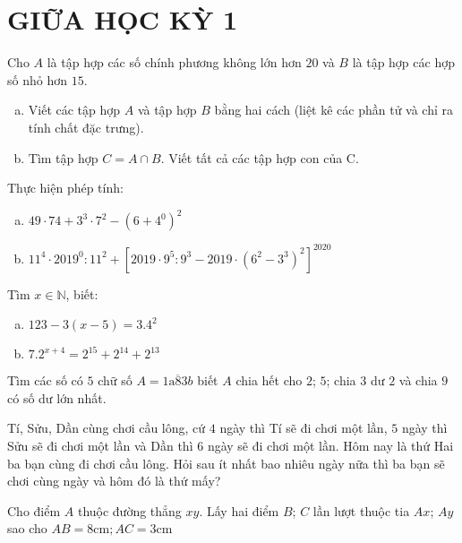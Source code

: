 \section{GIỮA HỌC KỲ 1}
\setcounter{ex}{0}
\begin{ex} Cho $A$ là tập hợp các số chính phương không lớn hơn $20$ và $B$ là tập hợp các hợp số nhỏ hơn $15$.
	\begin{enumerate}[a)]
	\item Viết các tập hợp $A$ và tập hợp $B$ bằng hai cách (liệt kê các phần tử và chỉ ra tính chất đặc trưng).
	\item Tìm tập hợp $C=A \cap B$. Viết tất cả các tập hợp con của C.
	\end{enumerate}
%
\end{ex}    \begin{ex} Thực hiện phép tính:
\begin{enumerate}[a)]
	\item $49 \cdot 74+3^{3} \cdot 7^{2}-\left(6+4^{0}\right)^{2}$
	\item $11^{4} \cdot 2019^{0}: 11^{2}+\left[2019 \cdot 9^{5}: 9^{3}-2019 \cdot\left(6^{2}-3^{3}\right)^{2}\right]^{2020}$
	\end{enumerate} 
	\end{ex}    \begin{ex} Tìm $x \in \mathbb{N}$, biết:
	\begin{enumerate}[a)]
	\item $123-3(x-5)=3.4^{2}$
	\item $7.2^{x+4}=2^{15}+2^{14}+2^{13}$
	\end{enumerate}
\end{ex}    \begin{ex}  Tìm các số có $5$ chữ số $A=\overline{1 \mathrm{a} 83 b}$ biết $A$ chia hết cho $2$; $5$; chia $3$ dư $2$ và chia $9$ có số dư lớn nhất.
\end{ex}    \begin{ex}  Tí, Sửu, Dần cùng chơi cầu lông, cứ $4$ ngày thì Tí sẽ đi chơi một lần, $5$ ngày thì Sửu sẽ đi chơi một lần và Dần thì $6$ ngày sẽ đi chơi một lần. Hôm nay là thứ Hai ba bạn cùng đi chơi cầu lông. Hỏi sau ít nhất bao nhiêu ngày nữa thì ba bạn sẽ chơi cùng ngày và hôm đó là thứ mấy?
\end{ex}    \begin{ex}  Cho điểm $A$ thuộc đường thẳng $xy$. Lấy hai điểm $B$; $C$ lần lượt thuộc tia $Ax$; $Ay$  sao cho $A B=8 \mathrm{cm} ; A C=3 \mathrm{cm}$
\begin{enumerate}[a)]

\end{enumerate}
\end{ex}

